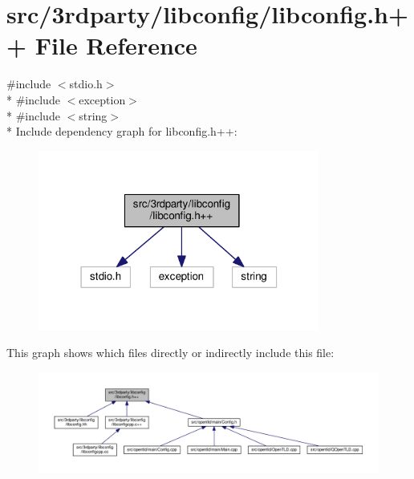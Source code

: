 \hypertarget{libconfig_8h_09_09}{\section{src/3rdparty/libconfig/libconfig.h++ File Reference}
\label{libconfig_8h_09_09}
}
{\ttfamily \#include $<$stdio.\-h$>$}\\*
{\ttfamily \#include $<$exception$>$}\\*
{\ttfamily \#include $<$string$>$}\\*
Include dependency graph for libconfig.\-h++\-:\nopagebreak
\begin{figure}[H]
\begin{center}
\leavevmode
\includegraphics[width=262pt]{libconfig_8h_09_09__incl}
\end{center}
\end{figure}
This graph shows which files directly or indirectly include this file\-:\nopagebreak
\begin{figure}[H]
\begin{center}
\leavevmode
\includegraphics[width=350pt]{libconfig_8h_09_09__dep__incl}
\end{center}
\end{figure}
